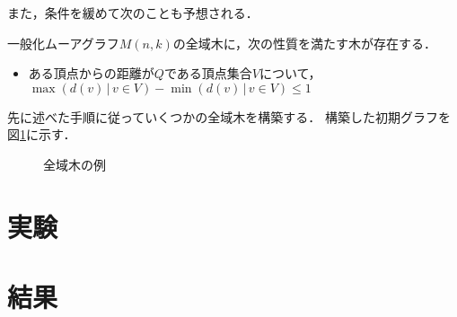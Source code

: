 また，条件を緩めて次のことも予想される．
\begin{conjecture}
  \label{conj:spanning-tree-2}
  一般化ムーアグラフ$M(n,k)$の全域木に，次の性質を満たす木が存在する．
  \begin{itemize}
  \item ある頂点からの距離が$Q$である頂点集合$V$について，
    $\max(d(v)\,|\,v\in V)-\min(d(v)\,|\,v\in V)\leq 1$
  \end{itemize}
\end{conjecture}

\begin{example}
  先に述べた手順に従っていくつかの全域木を構築する．
  構築した初期グラフを図\ref{fig:initial-spanning-tree-example}に示す．
  \begin{figure}
    \centering
    \hfill
    \caption{全域木の例}
    \label{fig:initial-spanning-tree-example}
  \end{figure}
\end{example}

\section{実験}
\label{sect:exp-reduce-by-initial}

\section{結果}
\label{sect:result-reduce-by-initial}
